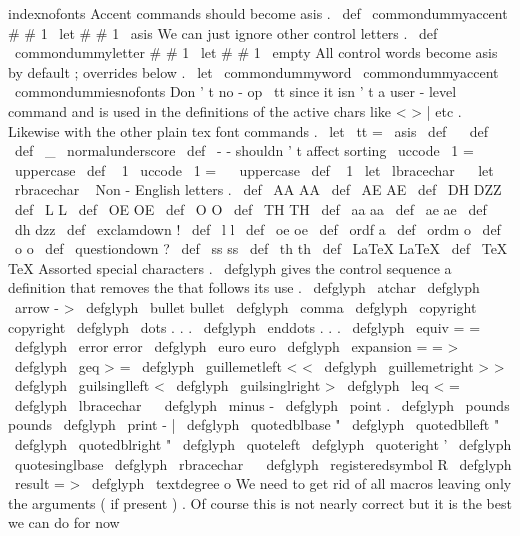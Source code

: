 {{{{indexnofonts
{
%
%
Accent
commands
should
become
asis
.
\
def
\
commondummyaccent
#
#
1
{
\
let
#
#
1
\
asis
}
%
%
We
can
just
ignore
other
control
letters
.
\
def
\
commondummyletter
#
#
1
{
\
let
#
#
1
\
empty
}
%
%
All
control
words
become
asis
by
default
;
overrides
below
.
\
let
\
commondummyword
\
commondummyaccent
\
commondummiesnofonts
%
%
Don
'
t
no
-
op
\
tt
since
it
isn
'
t
a
user
-
level
command
%
and
is
used
in
the
definitions
of
the
active
chars
like
<
>
|
etc
.
%
Likewise
with
the
other
plain
tex
font
commands
.
%
\
let
\
tt
=
\
asis
%
\
def
\
{
}
%
\
def
\
{
}
%
\
def
\
_
{
\
normalunderscore
}
%
\
def
\
-
{
}
%
-
shouldn
'
t
affect
sorting
%
\
uccode
\
1
=
\
{
\
uppercase
{
\
def
\
{
{
1
}
}
%
\
uccode
\
1
=
\
}
\
uppercase
{
\
def
\
}
{
1
}
}
%
\
let
\
lbracechar
\
{
%
\
let
\
rbracechar
\
}
%
%
%
Non
-
English
letters
.
\
def
\
AA
{
AA
}
%
\
def
\
AE
{
AE
}
%
\
def
\
DH
{
DZZ
}
%
\
def
\
L
{
L
}
%
\
def
\
OE
{
OE
}
%
\
def
\
O
{
O
}
%
\
def
\
TH
{
TH
}
%
\
def
\
aa
{
aa
}
%
\
def
\
ae
{
ae
}
%
\
def
\
dh
{
dzz
}
%
\
def
\
exclamdown
{
!
}
%
\
def
\
l
{
l
}
%
\
def
\
oe
{
oe
}
%
\
def
\
ordf
{
a
}
%
\
def
\
ordm
{
o
}
%
\
def
\
o
{
o
}
%
\
def
\
questiondown
{
?
}
%
\
def
\
ss
{
ss
}
%
\
def
\
th
{
th
}
%
%
\
def
\
LaTeX
{
LaTeX
}
%
\
def
\
TeX
{
TeX
}
%
%
%
Assorted
special
characters
.
\
defglyph
gives
the
control
sequence
a
%
definition
that
removes
the
{
}
that
follows
its
use
.
\
defglyph
\
atchar
{
}
%
\
defglyph
\
arrow
{
-
>
}
%
\
defglyph
\
bullet
{
bullet
}
%
\
defglyph
\
comma
{
}
%
\
defglyph
\
copyright
{
copyright
}
%
\
defglyph
\
dots
{
.
.
.
}
%
\
defglyph
\
enddots
{
.
.
.
}
%
\
defglyph
\
equiv
{
=
=
}
%
\
defglyph
\
error
{
error
}
%
\
defglyph
\
euro
{
euro
}
%
\
defglyph
\
expansion
{
=
=
>
}
%
\
defglyph
\
geq
{
>
=
}
%
\
defglyph
\
guillemetleft
{
<
<
}
%
\
defglyph
\
guillemetright
{
>
>
}
%
\
defglyph
\
guilsinglleft
{
<
}
%
\
defglyph
\
guilsinglright
{
>
}
%
\
defglyph
\
leq
{
<
=
}
%
\
defglyph
\
lbracechar
{
\
{
}
%
\
defglyph
\
minus
{
-
}
%
\
defglyph
\
point
{
.
}
%
\
defglyph
\
pounds
{
pounds
}
%
\
defglyph
\
print
{
-
|
}
%
\
defglyph
\
quotedblbase
{
"
}
%
\
defglyph
\
quotedblleft
{
"
}
%
\
defglyph
\
quotedblright
{
"
}
%
\
defglyph
\
quoteleft
{
}
%
\
defglyph
\
quoteright
{
'
}
%
\
defglyph
\
quotesinglbase
{
}
%
\
defglyph
\
rbracechar
{
\
}
}
%
\
defglyph
\
registeredsymbol
{
R
}
%
\
defglyph
\
result
{
=
>
}
%
\
defglyph
\
textdegree
{
o
}
%
%
%
We
need
to
get
rid
of
all
macros
leaving
only
the
arguments
(
if
present
)
.
%
Of
course
this
is
not
nearly
correct
but
it
is
the
best
we
can
do
for
now
}}}}}
